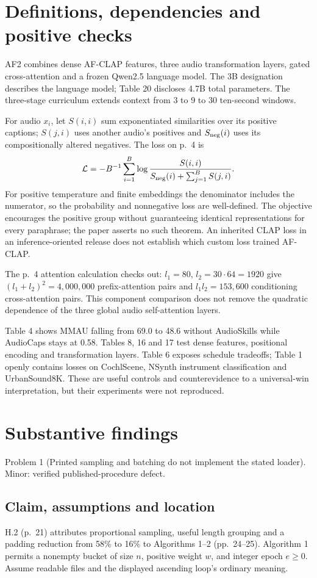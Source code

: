 \documentclass[10pt]{article}
\begin{document}
\section*{Definitions, dependencies and positive checks}
AF2 combines dense AF-CLAP features, three audio transformation layers, gated cross-attention and a frozen Qwen2.5 language model. The 3B designation describes the language model; Table 20 discloses 4.7B total parameters. The three-stage curriculum extends context from 3 to 9 to 30 ten-second windows.\par
For audio \(x_i\), let \(S(i,i)\) sum exponentiated similarities over its positive captions; \(S(j,i)\) uses another audio’s positives and \(S_{\rm neg}(i)\) uses its compositionally altered negatives. The loss on p. 4 is \[\mathcal{L}=-B^{-1}\sum_{i=1}^B
 \log\frac{S(i,i)}{S_{\rm neg}(i)+\sum_{j=1}^B S(j,i)} .\] For positive temperature and finite embeddings the denominator includes the numerator, so the probability and nonnegative loss are well-defined. The objective encourages the positive group without guaranteeing identical representations for every paraphrase; the paper asserts no such theorem. An inherited CLAP loss in an inference-oriented release does not establish which custom loss trained AF-CLAP.\par
The p. 4 attention calculation checks out: \(l_1=80\), \(l_2=30\cdot64=1920\) give \((l_1+l_2)^2=4{,}000{,}000\) prefix-attention pairs and \(l_1l_2=153{,}600\) conditioning cross-attention pairs. This component comparison does not remove the quadratic dependence of the three global audio self-attention layers.\par
Table 4 shows MMAU falling from 69.0 to 48.6 without AudioSkills while AudioCaps stays at 0.58. Tables 8, 16 and 17 test dense features, positional encoding and transformation layers. Table 6 exposes schedule tradeoffs; Table 1 openly contains losses on CochlScene, NSynth instrument classification and UrbanSound8K. These are useful controls and counterevidence to a universal-win interpretation, but their experiments were not reproduced.\par
\section*{Substantive findings}
Problem 1 (Printed sampling and batching do not implement the stated loader).  Minor: verified published-procedure defect.\par
\subsection*{Claim, assumptions and location}
H.2 (p. 21) attributes proportional sampling, useful length grouping and a padding reduction from 58\% to 16\% to Algorithms 1–2 (pp. 24–25). Algorithm 1 permits a nonempty bucket of size \(n\), positive weight \(w\), and integer epoch \(e\geq0\). Assume readable files and the displayed ascending loop’s ordinary meaning.\par
\end{document}
